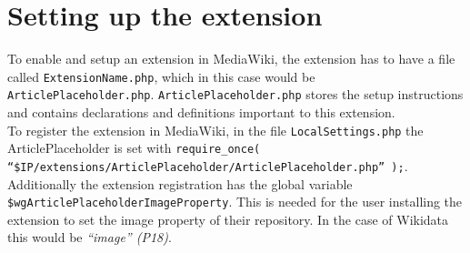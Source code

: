\section{Setting up the extension}
	To enable and setup an extension in MediaWiki, the extension has to have a file called \texttt{\justify ExtensionName.php}, which in this case would be \texttt{\justify ArticlePlaceholder.php}. \texttt{\justify ArticlePlaceholder.php} stores the setup instructions and contains declarations and definitions important to this extension. \\
	To register the extension in MediaWiki, in the file \texttt{\justify LocalSettings.php} the ArticlePlaceholder is set with \texttt{\justify require\_once( ``\$IP/extensions/ArticlePlaceholder/ArticlePlaceholder.php'' );}. \\
	Additionally the extension registration has the global variable \texttt{\justify \$wgArticlePlaceholderImageProperty}. This is needed for the user installing the extension to set the image property of their repository. In the case of Wikidata this would be \textit{``image'' (P18)}. \citep{wiki:23}